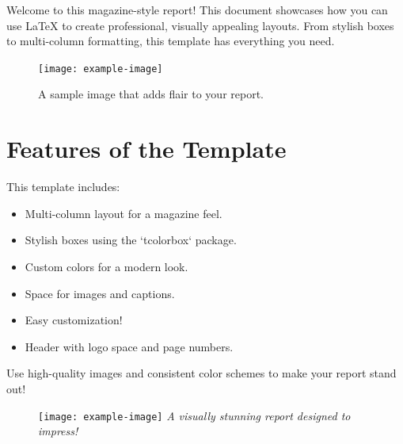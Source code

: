 \documentclass[11pt,a4paper,twoside]{paper}
\begin{document}
\newpage  %

\begin{multicols}{2}

\begin{tcolorbox}[magazineBox, title=Introduction]
Welcome to this magazine-style report! This document showcases how you can use LaTeX to create professional, visually appealing layouts. From stylish boxes to multi-column formatting, this template has everything you need.
\end{tcolorbox}



\begin{figure}[H]
    \texttt{[image: example-image]} %
    \caption{A sample image that adds flair to your report.}
\end{figure}


\vspace{1em}
\section{Features of the Template}
This template includes:
\begin{itemize}
    \item Multi-column layout for a magazine feel.
    \item Stylish boxes using the `tcolorbox` package.
    \item Custom colors for a modern look.
    \item Space for images and captions.
    \item Easy customization!
    \item Header with logo space and page numbers.
\end{itemize}

\vspace{1em}
\begin{tcolorbox}[highlightBox, title=Pro Tip!]
Use high-quality images and consistent color schemes to make your report stand out!
\end{tcolorbox}

\begin{figure}[!ht]
    \centering
    \texttt{[image: example-image]} %
    \hrulefill
    \textit{\large A visually stunning report designed to impress!}
    \label{fig:enter-label}
\end{figure}


\end{multicols}
\end{document}
